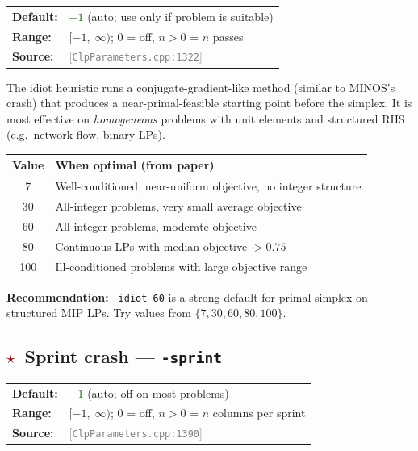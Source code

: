 \documentclass[11pt,a4paper]{article}
\newcommand{\param}[1]{\texttt{\textbf{#1}}}
\newcommand{\val}[1]{\texttt{#1}}
\newcommand{\src}[1]{\textcolor{gray}{\small[\texttt{#1}]}}
\newcommand{\default}[1]{\textcolor{darkgreen}{\texttt{#1}}}
\newcommand{\important}{\textcolor{darkred}{\textbf{$\star$}}}
\begin{document}
\begin{tabular}{@{}ll@{}}
  \textbf{Default:} & \default{$-1$} (auto; use only if problem is suitable) \\
  \textbf{Range:}   & $[-1,\; \infty)$; $0$ = off, $n > 0$ = $n$ passes \\
  \textbf{Source:}  & \src{ClpParameters.cpp:1322}
\end{tabular}

\medskip
The idiot heuristic runs a conjugate-gradient-like method (similar to MINOS's
crash) that produces a near-primal-feasible starting point before the simplex.
It is most effective on \emph{homogeneous} problems with unit elements and
structured RHS (e.g.\ network-flow, binary LPs).

\begin{center}
\begin{tabular}{@{}cl@{}}
  \toprule
  \textbf{Value} & \textbf{When optimal (from paper)} \\
  \midrule
  7   & Well-conditioned, near-uniform objective, no integer structure \\
  30  & All-integer problems, very small average objective \\
  60  & All-integer problems, moderate objective \\
  80  & Continuous LPs with median objective $> 0.75$ \\
  100 & Ill-conditioned problems with large objective range \\
  \bottomrule
\end{tabular}
\end{center}

\begin{tipbox}
  \textbf{Recommendation:} \val{-idiot 60} is a strong default for primal simplex
  on structured MIP LPs. Try values from $\{7, 30, 60, 80, 100\}$.
\end{tipbox}

\subsection{\important\ Sprint crash --- \param{-sprint}}

\begin{tabular}{@{}ll@{}}
  \textbf{Default:} & \default{$-1$} (auto; off on most problems) \\
  \textbf{Range:}   & $[-1,\; \infty)$; $0$ = off, $n > 0$ = $n$ columns per sprint \\
  \textbf{Source:}  & \src{ClpParameters.cpp:1390}
\end{tabular}
\end{document}
